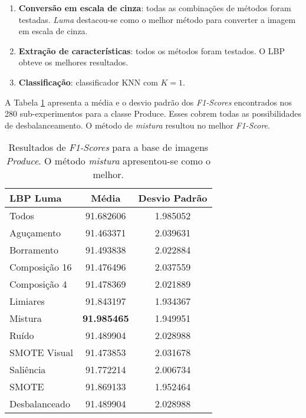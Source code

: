 \begin{enumerate}
\item \textbf{Conversão em escala de cinza}: todas as combinações de métodos foram testadas. \emph{Luma} destacou-se como o melhor método para converter a imagem em escala de cinza.
\item \textbf{Extração de características}: todos os métodos foram testados. O LBP obteve os melhores resultados.
\item \textbf{Classificação}: classificador KNN com $K=1$.
\end{enumerate}


A Tabela \ref{tab:resultados:3.3} apresenta a média e o desvio padrão dos \textit{F1-Scores} encontrados nos 280 sub-experimentos para a classe Produce. Esses cobrem todas as possibilidades de desbalanceamento. O método de \emph{mistura} resultou no melhor \textit{F1-Score}.

\begin{table}[H]
\begin{center}
\caption{Resultados de \textit{F1-Scores} para a base de imagens \textit{Produce}. O método \emph{mistura} apresentou-se como o melhor.}
\label{tab:resultados:3.3}
\begin{tabular}{|l|c|c|}
\hline
\textbf{LBP Luma} & \textbf{Média}     & \textbf{Desvio Padrão} \\ \hline
   Todos        &  91.682606 &  1.985052  \\ \hline
  Aguçamento    &  91.463371 &  2.039631  \\ \hline
  Borramento    &  91.493838 &  2.022884  \\ \hline
  Composição 16 &  91.476496 &  2.037559  \\ \hline
  Composição 4  &  91.478369 &  2.021889  \\ \hline
  Limiares      &  91.843197 &  1.934367  \\ \hline
  Mistura       &  \textbf{91.985465} &  1.949951  \\ \hline
  Ruído         &  91.489904 &  2.028988  \\ \hline
  SMOTE Visual  &  91.473853 &  2.031678  \\ \hline
  Saliência     &  91.772214 &  2.006734  \\ \hline
 SMOTE          &  91.869133 &  1.952464  \\ \hline
Desbalanceado   &  91.489904 &  2.028988  \\ \hline
\end{tabular}
\end{center}
\end{table}

